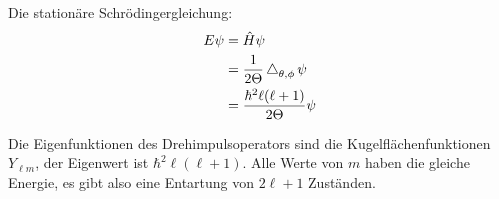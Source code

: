 Die stationäre Schrödingergleichung:
\begin{align*}
	E \psi &= \hat H \psi \\
			  &= \frac1{2\Theta} \operatorname{\bigtriangleup}_{\theta,\phi} \psi \\
		   &= \frac{\hbar^2 \ell (\ell + 1)}{2 \Theta} \psi
\end{align*}

Die Eigenfunktionen des Drehimpulsoperators sind die Kugelflächenfunktionen
$Y_{\ell m}$, der Eigenwert ist $\hbar^2 \ell(\ell+1)$. Alle Werte von $m$
haben die gleiche Energie, es gibt also eine Entartung von $2\ell+1$ Zuständen.


\IfFileExists{\bibliographyfile}{
}{}



